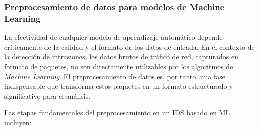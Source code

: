 \subsubsection{Preprocesamiento de datos para modelos de Machine Learning}

La efectividad de cualquier modelo de aprendizaje automático depende críticamente de la calidad y el formato de los datos de entrada. En el contexto de la detección de intrusiones, los datos brutos de tráfico de red, capturados en formato de paquetes, no son directamente utilizables por los algoritmos de \textit{Machine Learning}. El preprocesamiento de datos es, por tanto, una fase indispensable que transforma estos paquetes en un formato estructurado y significativo para el análisis.

Las etapas fundamentales del preprocesamiento en un IDS basado en ML incluyen:

